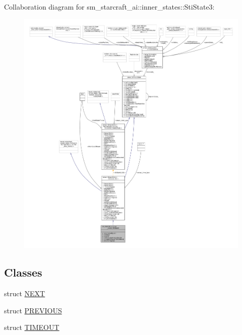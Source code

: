 Collaboration diagram for sm\+\_\+starcraft\+\_\+ai\+:\+:inner\+\_\+states\+:\+:Sti\+State3\+:
\nopagebreak
\begin{figure}[H]
\begin{center}
\leavevmode
\includegraphics[width=350pt]{structsm__starcraft__ai_1_1inner__states_1_1StiState3__coll__graph}
\end{center}
\end{figure}
\subsection*{Classes}
\begin{DoxyCompactItemize}
\item 
struct \hyperlink{structsm__starcraft__ai_1_1inner__states_1_1StiState3_1_1NEXT}{N\+E\+XT}
\item 
struct \hyperlink{structsm__starcraft__ai_1_1inner__states_1_1StiState3_1_1PREVIOUS}{P\+R\+E\+V\+I\+O\+US}
\item 
struct \hyperlink{structsm__starcraft__ai_1_1inner__states_1_1StiState3_1_1TIMEOUT}{T\+I\+M\+E\+O\+UT}
\end{DoxyCompactItemize}
